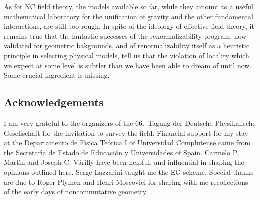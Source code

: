\documentclass[a4paper,12pt]{article}
\providecommand{\1}{\mathbf{1}}         %
\providecommand{\7}{\dagger}            %
\providecommand{\8}{\bullet}            %
\renewcommand{\.}{\cdot}            %
\renewcommand{\:}{\colon}           %
\begin{document}
As for NC field theory, the models available so far, while they amount
to a useful mathematical laboratory for the unification of gravity and the
other fundamental interactions, are still too rough. In spite of the
ideology of effective field theory, it remains true that the fantastic
successes of the renormalizability program, now validated for
geometric bakgrounds, and of renormalizability itself as a heuristic
principle in selecting physical models, tell us that the violation of
locality which we expect at some level is subtler than we have been
able to dream of until now. Some crucial ingredient is missing.


\subsection*{Acknowledgements}

I am very grateful to the organizers of the 66.~Tagung der Deutsche
Physikalische Gesellschaft for the invitation to survey the field.
Financial support for my stay at the Departamento de F\'{\i}sica
Te\'orica I of Universidad Complutense came from the Secretar\'{\i}a
de Estado de Educaci\'on y Universidades of Spain. Carmelo P.
Mart\'{\i}n and Joseph C. V\'arilly have been helpful, and influential
in shaping the opinions outlined here. Serge Lazzarini taught me the
EG scheme. Special thanks are due to Roger Plymen and Henri
Moscovici for sharing with me recollections of the early days of
noncommutative geometry.
\end{document}
